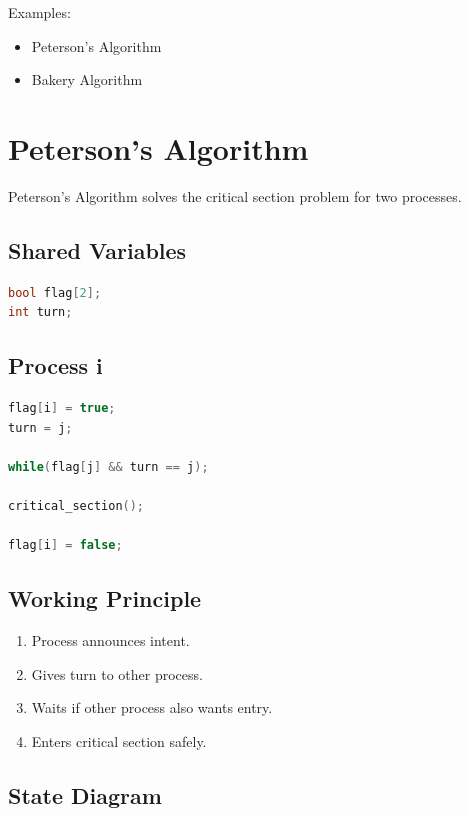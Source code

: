 Examples:

\begin{itemize}
\item Peterson's Algorithm
\item Bakery Algorithm
\end{itemize}

\section{Peterson's Algorithm}

Peterson's Algorithm solves the critical section problem for two processes.

\subsection{Shared Variables}

\begin{lstlisting}[language=C++,style=interviewcode]
bool flag[2];
int turn;
\end{lstlisting}

\subsection{Process i}

\begin{lstlisting}[language=C++,style=interviewcode]
flag[i] = true;
turn = j;

while(flag[j] && turn == j);

critical_section();

flag[i] = false;
\end{lstlisting}

\subsection{Working Principle}

\begin{enumerate}
\item Process announces intent.
\item Gives turn to other process.
\item Waits if other process also wants entry.
\item Enters critical section safely.
\end{enumerate}

\subsection{State Diagram}

